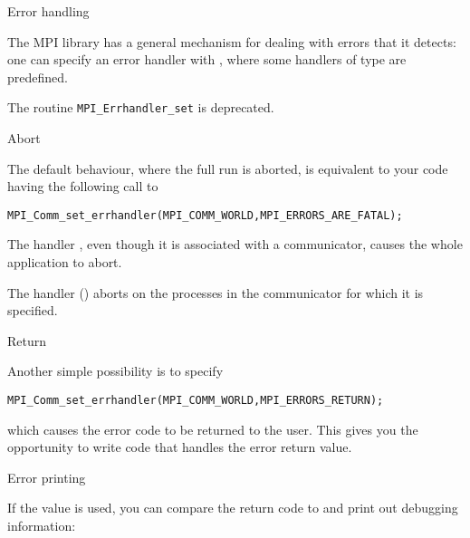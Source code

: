  {Error handling}
\label{sec:mpi-error}

The MPI library has a general mechanism for dealing with errors that
it detects: one can specify an error handler
with ,
where some handlers of type  are predefined.

\begin{remark}
  The routine
  \lstinline{MPI_Errhandler_set} is deprecated.
\end{remark}

 {Abort}

The default behaviour, where the full run is aborted, is
equivalent to your code having the following
call to 
\begin{lstlisting}
MPI_Comm_set_errhandler(MPI_COMM_WORLD,MPI_ERRORS_ARE_FATAL);
\end{lstlisting}

The handler , even though it is
associated with a communicator, causes the whole application to abort.

\begin{mpifour}
  The handler  ()
  aborts on the processes in the communicator for which it is specified.
\end{mpifour}

 {Return}

Another simple possibility is to specify
\begin{lstlisting}
MPI_Comm_set_errhandler(MPI_COMM_WORLD,MPI_ERRORS_RETURN);
\end{lstlisting}
which causes the error code to be returned to the user.
This gives you the opportunity to write code that handles the error
return value. 

 {Error printing}

If the  value  is used,
you can compare the return code to 
and  print out debugging information:

